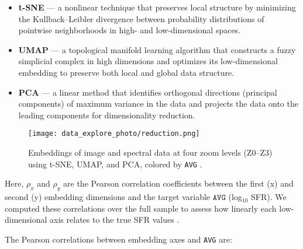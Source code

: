 \documentclass[english,bachelor,oneside]{ctufit-thesis}
\begin{document}
\begin{itemize}
  \item \textbf{t-SNE} \cite{maaten2008visualizing} — a nonlinear technique that preserves local structure by minimizing the Kullback–Leibler divergence between probability distributions of pointwise neighborhoods in high- and low-dimensional spaces.
  \item \textbf{UMAP} \cite{mcinnes2018umap} — a topological manifold learning algorithm that constructs a fuzzy simplicial complex in high dimensions and optimizes its low-dimensional embedding to preserve both local and global data structure.
  \item \textbf{PCA} \cite{jolliffe2002principal} — a linear method that identifies orthogonal directions (principal components) of maximum variance in the data and projects the data onto the leading components for dimensionality reduction.
\end{itemize}

\begin{figure}[H]
  \centering
  \texttt{[image: data\_explore\_photo/reduction.png]}
  \caption{Embeddings of image and spectral data at four zoom levels (Z0–Z3) using t-SNE, UMAP, and PCA, colored by \texttt{AVG} \cite{combined}.}
  \label{fig:embeddings_all}
\end{figure}

\noindent Here, $\rho_x$ and $\rho_y$ are the Pearson correlation coefficients between the first (x) and second (y) embedding dimensions and the target variable $\texttt{AVG}$ (log$_{10}$ SFR). We computed these correlations over the full sample to assess how linearly each low-dimensional axis relates to the true SFR values \cite{Hastie2009}. 

The Pearson correlations between embedding axes and \texttt{AVG} are:
\end{document}
